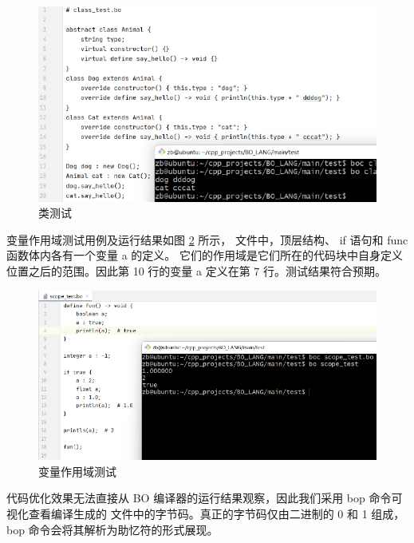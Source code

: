 \begin{figure}[H]
    \centering\includegraphics{figure/test_class.pdf}
    \caption{类测试}
    \label{fig_test_class}
\end{figure}


变量作用域测试用例及运行结果如图 \ref{fig_test_scope} 所示，  文件中，顶层结构、 if 语句和 func 函数体内各有一个变量 a 的定义。
它们的作用域是它们所在的代码块中自身定义位置之后的范围。因此第 10 行的变量 a 定义在第 7 行。测试结果符合预期。
\begin{figure}[H]
    \centering\includegraphics{figure/test_scope.pdf}
    \caption{变量作用域测试}
    \label{fig_test_scope}
\end{figure}


代码优化效果无法直接从 BO 编译器的运行结果观察，因此我们采用 bop 命令可视化查看编译生成的  文件中的字节码。真正的字节码仅由二进制的 0 和 1 组成， bop 命令会将其解析为助忆符的形式展现。

